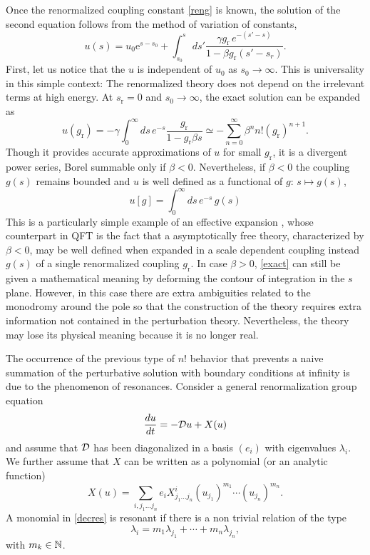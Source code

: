 \documentclass[12pt,here,feynmf]{article}
\begin{document}
Once the renormalized coupling constant \eqref{reng} is known, the solution of the second equation follows from the method of variation of constants,
\begin{equation}
u(s)=u_{0}\mathrm{e}^{s-s_{0}}+\int_{s_{0}}^{s}\,ds'
\frac{\gamma g_{\mathrm{r}}\,e^{-(s'-s)}}{1-\beta g_{\mathrm{r}}(s'-s_{r})}.\label{exact}
\end{equation}
First, let us notice that the $u$ is independent of $u_{0}$ as $s_{0}\rightarrow\infty$. This is universality in this simple context: The renormalized theory does not depend on the irrelevant terms at high energy. 
At $s_{\mathrm{r}}=0$ and $s_{0}\rightarrow\infty$, the exact solution can be expanded as
\begin{equation}
u(g_{\mathrm{r}})=-\gamma\int_{0}^{\infty}\!ds\,e^{-s}\frac{g_{\mathrm{r}}}{1-g_{\mathrm{r}}\beta
s}\simeq
-\mathop{\sum}\limits_{n=0}^{\infty}\beta^{n}n!(g_{\mathrm{r}})^{n+1}.
\end{equation}
Though it provides accurate approximations of $u$ for small $g_{\mathrm r}$, it is a divergent power series, Borel summable only if $\beta<0$. Nevertheless, if $\beta<0$ the coupling $g(s)$ remains bounded and $u$ is well defined as a functional of $g:\,s\mapsto g(s)$,
\begin{equation}
u[g]=\int_{0}^{\infty}ds\,e^{-s}\,g(s)
\end{equation}
This is a particularly simple example of an effective expansion \cite{constructive}, whose counterpart in QFT is the  fact that a asymptotically free theory, characterized by $\beta<0$, may be well defined when expanded in a scale dependent coupling instead $g(s)$ of a single renormalized coupling $g_{\mathrm{r}}$.  In case $\beta>0$, \eqref{exact} can still be given a mathematical meaning by deforming the contour of integration in the $s$ plane. However, in this case there are extra ambiguities related to the monodromy around the pole so that the construction of the theory requires extra information not contained in the perturbation theory.  Nevertheless, the theory may lose its physical meaning because it is no longer real.

The occurrence of the previous type of $n!$ behavior that prevents a naive summation of the perturbative solution with boundary conditions at infinity is due to the phenomenon of resonances. Consider a general renormalization group equation  
\begin{equation}
\frac{du}{dt}=-{\cal D}u+X(u)\label{non linear}
\end{equation}
and assume that ${\cal D}$ has been diagonalized in a basis $(e_{i})$ with eigenvalues $\lambda_{i}$. We further assume that $X$ can be written as a polynomial (or an analytic function)
\begin{equation}
X(u)=\sum_{i,j_{1}\dots j_{n}}e_{i} X^{i}_{j_{1}\dots j_{n}}
(u_{j_{1}})^{m_{1}}\cdots (u_{j_{n}})^{m_{n}}.\label{decres}
\end{equation}
A monomial in \eqref{decres} is resonant if there is a non trivial relation of the type
\begin{equation}
\lambda_{i}=m_{1}\lambda_{j_{1}}+\cdots+m_{n}\lambda_{j_{n}},\label{resonance}
\end{equation}
with $m_{k}\in{\Bbb N}$. 
\end{document}
